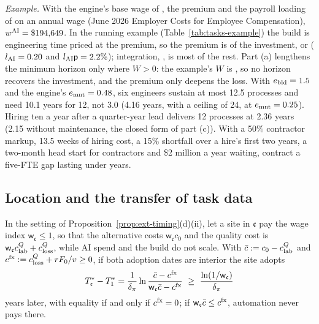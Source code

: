 \noindent\emph{Example.} With the engine's base wage of \labWSE, the \labPremRate{} premium and the payroll loading of \labTauL{} on an annual wage (June 2026 Employer Costs for Employee Compensation), $w^{\rm AI}=\$194{,}649$. In the running example (Table~\ref{tab:tasks-example}) the build \icFbuild{} is engineering time priced at the premium, so the premium is \labPremAmt{} of the \icF{} investment, or \labPremShareF{} ($l_{\rm AI}=0.20$ and $l_{\rm AI}\mathsf p=2.2\%$); integration, \icFint, is most of the rest. Part (a) lengthens the minimum horizon only where $W>0$: the example's $W$ is \icW, so no horizon recovers the investment, and the premium only deepens the loss. With $e_{\rm bld}=1.5$ and the engine's $e_{\rm mnt}=0.48$, six engineers sustain at most 12.5 processes and need 10.1 years for 12, not 3.0 (4.16 years, with a ceiling of 24, at $e_{\rm mnt}=0.25$). Hiring ten a year after a quarter-year lead delivers 12 processes at 2.36 years (2.15 without maintenance, the closed form of part (c)). With a 50\% contractor markup, 13.5 weeks of hiring cost, a 15\% shortfall over a hire's first two years, a two-month head start for contractors and \$2 million a year waiting, contract a five-FTE gap lasting under \labContractT{} years.

\subsection{Location and the transfer of task data}\label{sec:labor-location}

\begin{lemma}\label{lem:labor-location}
In the setting of Proposition~\ref{prop:ext-timing}(d)(ii), let a site in $\mathfrak c$ pay the wage index $\mathsf w_{\mathfrak c}\le1$, so that the alternative costs $\mathsf w_{\mathfrak c}c_0$ and the quality cost is $\mathsf w_{\mathfrak c}c^Q_{\rm lab}+c^Q_{\rm loss}$, while AI spend and the build do not scale. With $\bar c:=c_0-c^Q_{\rm lab}$ and $c^{\rm fx}:=c^Q_{\rm loss}+rF_0/v\ge0$, if both adoption dates are interior the site adopts
\[
T^*_{\mathfrak c}-T^*_1=\frac1{\delta_\pi}\ln\frac{\bar c-c^{\rm fx}}{\mathsf w_{\mathfrak c}\bar c-c^{\rm fx}}\ \ge\ \frac{\ln(1/\mathsf w_{\mathfrak c})}{\delta_\pi}
\]
years later, with equality if and only if $c^{\rm fx}=0$; if $\mathsf w_{\mathfrak c}\bar c\le c^{\rm fx}$, automation never pays there.
\end{lemma}

